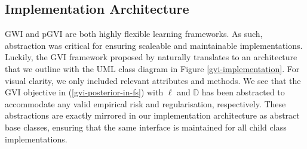 \documentclass{article}
\numberwithin{equation}{section}
\begin{document}
\subsection{Implementation Architecture}\label{implementation-architecture}
GWI and pGVI are both highly flexible learning frameworks. 
As such, abstraction was critical for ensuring scaleable and maintainable implementations.
Luckily, the GVI framework proposed by \cite{knoblauch2022optimization} naturally translates to an architecture that we outline with the UML class diagram in Figure \ref{gvi-implementation}.
For visual clarity, we only included relevant attributes and methods.
We see that the GVI objective in (\ref{gvi-posterior-in-fs}) with $\ell$ and $\mathbb{D}$ has been abstracted to accommodate any valid empirical risk and regularisation, respectively.
These abstractions are exactly mirrored in our implementation architecture as abstract base classes, ensuring that the same interface is maintained for all child class implementations.
\end{document}

